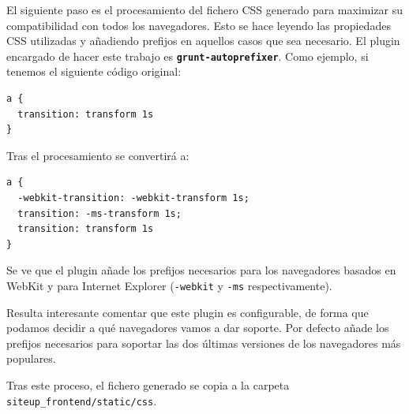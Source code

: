 El siguiente paso es el procesamiento del fichero CSS generado para maximizar su
compatibilidad con todos los navegadores. Esto se hace leyendo las propiedades
CSS utilizadas y añadiendo prefijos en aquellos casos que sea necesario. El
plugin encargado de hacer este trabajo es
\textbf{\texttt{grunt-autoprefixer}}. Como ejemplo, si tenemos el siguiente
código original:

\begin{verbatim}
a {
  transition: transform 1s
}
\end{verbatim}

Tras el procesamiento se convertirá a:

\begin{verbatim}
a {
  -webkit-transition: -webkit-transform 1s;
  transition: -ms-transform 1s;
  transition: transform 1s
}
\end{verbatim}

Se ve que el plugin añade los prefijos necesarios para los navegadores basados
en WebKit y para Internet Explorer (\texttt{-webkit} y \texttt{-ms}
respectivamente).

Resulta interesante comentar que este plugin es configurable, de forma que
podamos decidir a qué navegadores vamos a dar soporte. Por defecto añade los
prefijos necesarios para soportar las dos últimas versiones de los navegadores
más populares.

Tras este proceso, el fichero generado se copia a la carpeta
\texttt{siteup\_frontend/static/css}.


